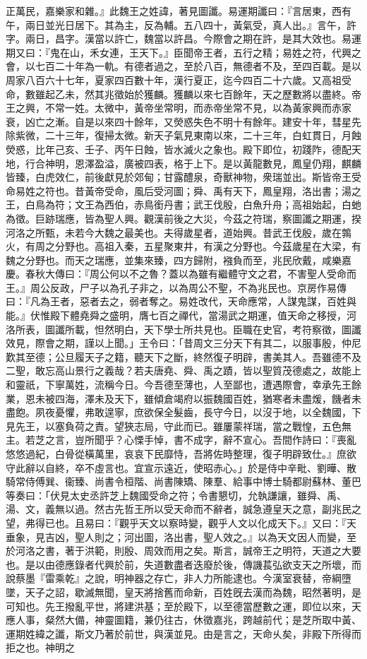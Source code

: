 \begin{pinyinscope}
正萬民，嘉樂家和雜。』此魏王之姓諱，著見圖讖。易運期讖曰：『言居東，西有午，兩日並光日居下。其為主，反為輔。五八四十，黃氣受，真人出。』言午，許字。兩日，昌字。漢當以許亡，魏當以許昌。今際會之期在許，是其大效也。易運期又曰：『鬼在山，禾女連，王天下。』臣聞帝王者，五行之精；易姓之符，代興之會，以七百二十年為一軌。有德者過之，至於八百，無德者不及，至四百載。是以周家八百六十七年，夏家四百數十年，漢行夏正，迄今四百二十六歲。又高祖受命，數雖起乙未，然其兆徵始於獲麟。獲麟以來七百餘年，天之歷數將以盡終。帝王之興，不常一姓。太微中，黃帝坐常明，而赤帝坐常不見，以為黃家興而赤家衰，凶亡之漸。自是以來四十餘年，又熒惑失色不明十有餘年。建安十年，彗星先除紫微，二十三年，復掃太微。新天子氣見東南以來，二十三年，白虹貫日，月蝕熒惑，比年己亥、壬子、丙午日蝕，皆水滅火之象也。殿下即位，初踐阼，德配天地，行合神明，恩澤盈溢，廣被四表，格于上下。是以黃龍數見，鳳皇仍翔，麒麟皆臻，白虎效仁，前後獻見於郊甸；甘露醴泉，奇獸神物，衆瑞並出。斯皆帝王受命易姓之符也。昔黃帝受命，風后受河圖；舜、禹有天下，鳳皇翔，洛出書；湯之王，白鳥為符；文王為西伯，赤鳥銜丹書；武王伐殷，白魚升舟；高祖始起，白虵為徵。巨跡瑞應，皆為聖人興。觀漢前後之大災，今茲之符瑞，察圖讖之期運，揆河洛之所甄，未若今大魏之最美也。夫得歲星者，道始興。昔武王伐殷，歲在鶉火，有周之分野也。高祖入秦，五星聚東井，有漢之分野也。今茲歲星在大梁，有魏之分野也。而天之瑞應，並集來臻，四方歸附，襁負而至，兆民欣戴，咸樂嘉慶。春秋大傳曰：『周公何以不之魯？蓋以為雖有繼體守文之君，不害聖人受命而王。』周公反政，尸子以為孔子非之，以為周公不聖，不為兆民也。京房作易傳曰：『凡為王者，惡者去之，弱者奪之。易姓改代，天命應常，人謀鬼謀，百姓與能。』伏惟殿下體堯舜之盛明，膺七百之禪代，當湯武之期運，值天命之移授，河洛所表，圖讖所載，怛然明白，天下學士所共見也。臣職在史官，考符察徵，圖讖效見，際會之期，謹以上聞。」王令曰：「昔周文三分天下有其二，以服事殷，仲尼歎其至德；公旦履天子之籍，聽天下之斷，終然復子明辟，書美其人。吾雖德不及二聖，敢忘高山景行之義哉？若夫唐堯、舜、禹之蹟，皆以聖質茂德處之，故能上和靈祇，下寧萬姓，流稱今日。今吾德至薄也，人至鄙也，遭遇際會，幸承先王餘業，恩未被四海，澤未及天下，雖傾倉竭府以振魏國百姓，猶寒者未盡煖，饑者未盡飽。夙夜憂懼，弗敢遑寧，庶欲保全髮齒，長守今日，以沒于地，以全魏國，下見先王，以塞負荷之責。望狹志局，守此而已。雖屢蒙祥瑞，當之戰惶，五色無主。若芝之言，豈所聞乎？心慄手悼，書不成字，辭不宣心。吾間作詩曰：『喪亂悠悠過紀，白骨從橫萬里，哀哀下民靡恃，吾將佐時整理，復子明辟致仕。』庶欲守此辭以自終，卒不虛言也。宜宣示遠近，使昭赤心。」於是侍中辛毗、劉曄、散騎常侍傅巽、衞臻、尚書令桓階、尚書陳矯、陳羣、給事中博士騎都尉蘇林、董巴等奏曰：「伏見太史丞許芝上魏國受命之符；令書懇切，允執謙讓，雖舜、禹、湯、文，義無以過。然古先哲王所以受天命而不辭者，誠急遵皇天之意，副兆民之望，弗得已也。且易曰：『觀乎天文以察時變，觀乎人文以化成天下。』又曰：『天垂象，見吉凶，聖人則之；河出圖，洛出書，聖人效之。』以為天文因人而變，至於河洛之書，著于洪範，則殷、周效而用之矣。斯言，誠帝王之明符，天道之大要也。是以由德應錄者代興於前，失道數盡者迭廢於後，傳譏萇弘欲支天之所壞，而說蔡墨『雷乘乾』之說，明神器之存亡，非人力所能逮也。今漢室衰替，帝綱墮墜，天子之詔，歇滅無聞，皇天將捨舊而命新，百姓旣去漢而為魏，昭然著明，是可知也。先王撥亂平世，將建洪基；至於殿下，以至德當歷數之運，即位以來，天應人事，粲然大備，神靈圖籍，兼仍往古，休徵嘉兆，跨越前代；是芝所取中黃、運期姓緯之讖，斯文乃著於前世，與漢並見。由是言之，天命乆矣，非殿下所得而拒之也。神明之
\end{pinyinscope}
